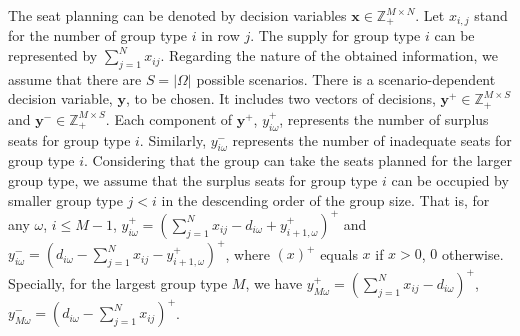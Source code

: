 The seat planning can be denoted by decision variables $\mathbf{x}\in \mathbb{Z}_{+}^{M \times N}$. Let $x_{i,j}$ stand for the number of group type $i$ in row $j$. The supply for group type $i$ can be represented by $\sum_{j=1}^N x_{ij}$.
Regarding the nature of the obtained information, we assume that there are $S = |\Omega|$ possible scenarios. There is a scenario-dependent decision variable, $\mathbf{y}$, to be chosen. It includes two vectors of decisions, $\mathbf{y}^{+} \in \mathbb{Z}_{+}^{M \times S}$ and $\mathbf{y}^{-} \in \mathbb{Z}_{+}^{M \times S}$. Each component of $\mathbf{y}^{+}$, $y_{i \omega}^{+}$, represents the number of surplus seats for group type $i$. Similarly, $y_{i \omega}^{-}$ represents the number of inadequate seats for group type $i$.
Considering that the group can take the seats planned for the larger group type, we assume that the surplus seats for group type $i$ can be occupied by smaller group type $j<i$ in the descending order of the group size. That is, for any $\omega$, $i \leq M-1$, $y_{i \omega}^{+}=\left(\sum_{j=1}^N x_{ij}- d_{i \omega} + y_{i+1, \omega}^{+}\right)^{+}$ and $y_{i \omega}^{-}=\left(d_{i \omega}- \sum_{j=1}^N x_{ij} - y_{i+1, \omega}^{+} \right)^{+}$, where $(x)^{+}$ equals $x$ if $x>0$, $0$ otherwise. Specially, for the largest group type $M$, we have $y_{M \omega}^{+} = (\sum_{j=1}^N x_{ij} - d_{i \omega})^{+}$, $y_{M \omega}^{-} = (d_{i \omega}- \sum_{j=1}^N x_{ij})^{+}$.







